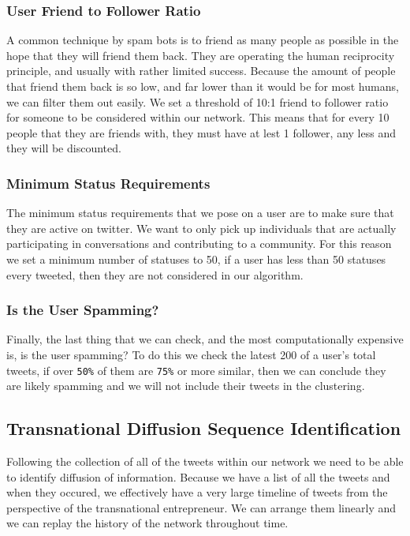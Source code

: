 \subsubsection{User Friend to Follower Ratio}
A common technique by spam bots is to friend as many people as possible in the hope that they will friend them back. They are operating the human reciprocity principle, and usually with rather limited success. Because the amount of people that friend them back is so low, and far lower than it would be for most humans, we can filter them out easily. We set a threshold of 10:1 friend to follower ratio for someone to be considered within our network. This means that for every 10 people that they are friends with, they must have at lest 1 follower, any less and they will be discounted.

\subsubsection{Minimum Status Requirements}
The minimum status requirements that we pose on a user are to make sure that they are active on twitter. We want to only pick up individuals that are actually participating in conversations and contributing to a community. For this reason we set a minimum number of statuses to 50, if a user has less than 50 statuses every tweeted, then they are not considered in our algorithm.

\subsubsection{Is the User Spamming?}
Finally, the last thing that we can check, and the most computationally expensive is, is the user spamming? To do this we check the latest 200 of a user's total tweets, if over \verb|50%| of them are \verb|75%| or more similar, then we can conclude they are likely spamming and we will not include their tweets in the clustering.

\subsection{Transnational Diffusion Sequence Identification}
Following the collection of all of the tweets within our network we need to be able to identify diffusion of information. Because we have a list of all the tweets and when they occured, we effectively have a very large timeline of tweets from the perspective of the transnational entrepreneur. We can arrange them linearly and we can replay the history of the network throughout time. 

